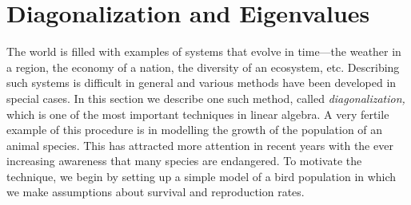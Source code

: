 \section{Diagonalization and Eigenvalues}
\label{sec:3_3}

The
 world is filled with examples of systems that evolve in time---the 
weather in a region, the economy of a nation, the diversity of an 
ecosystem, etc. Describing such systems is difficult in general and 
various methods have been developed in special cases. In this section we
 describe one such method, called \textit{diagonalization,} which is one 
of the most important techniques in linear algebra. A very fertile 
example of this procedure is in modelling the growth of the population 
of an animal species. This has attracted more attention in recent years 
with the ever increasing awareness that many species are endangered. To 
motivate the technique, we begin by setting up a simple model of a bird 
population in which we make assumptions about survival and reproduction 
rates.

